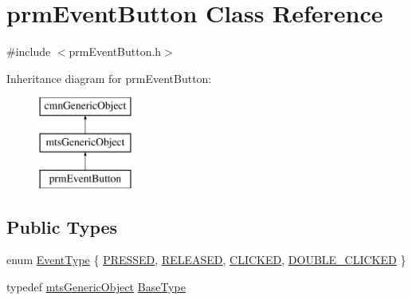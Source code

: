 \hypertarget{classprm_event_button}{\section{prm\-Event\-Button Class Reference}
\label{classprm_event_button}
}


{\ttfamily \#include $<$prm\-Event\-Button.\-h$>$}

Inheritance diagram for prm\-Event\-Button\-:\begin{figure}[H]
\begin{center}
\leavevmode
\includegraphics[height=3.000000cm]{da/df2/classprm_event_button}
\end{center}
\end{figure}
\subsection*{Public Types}
\begin{DoxyCompactItemize}
\item 
enum \hyperlink{classprm_event_button_ad25147a00b664a6df0de483dad956b0b}{Event\-Type} \{ \hyperlink{classprm_event_button_ad25147a00b664a6df0de483dad956b0ba19008009a3d9ae10cbcbcb95bf51a262}{P\-R\-E\-S\-S\-E\-D}, 
\hyperlink{classprm_event_button_ad25147a00b664a6df0de483dad956b0ba4ca564a58137b44d262b43b9c9f8bebb}{R\-E\-L\-E\-A\-S\-E\-D}, 
\hyperlink{classprm_event_button_ad25147a00b664a6df0de483dad956b0ba92d74c7dd98bd68c8118cc5e5b711dca}{C\-L\-I\-C\-K\-E\-D}, 
\hyperlink{classprm_event_button_ad25147a00b664a6df0de483dad956b0ba33ace8686d9bef1b5139573b9c09e7c3}{D\-O\-U\-B\-L\-E\-\_\-\-C\-L\-I\-C\-K\-E\-D}
 \}
\item 
typedef \hyperlink{classmts_generic_object}{mts\-Generic\-Object} \hyperlink{classprm_event_button_ad7f93b9f9585c48633382b39d118c151}{Base\-Type}
\end{DoxyCompactItemize}
